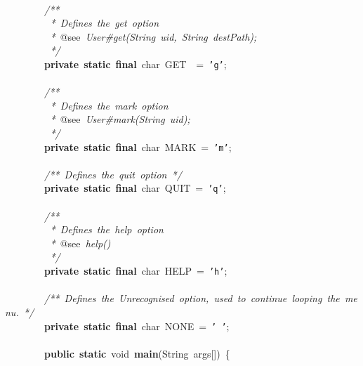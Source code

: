 \mbox{}\ \ \ \ \ \ \ \  \\
\mbox{}\ \ \ \ \ \ \ \ \textit{/**} \\
\mbox{}\textit{\ \ \ \ \ \ \ \ \ *\ Defines\ the\ get\ option} \\
\mbox{}\textit{\ \ \ \ \ \ \ \ \ *\ }@see\textit{\ User\#get(String\ uid,\ String\ destPath);} \\
\mbox{}\textit{\ \ \ \ \ \ \ \ \ */} \\
\mbox{}\ \ \ \ \ \ \ \ \textbf{private}\ \textbf{static}\ \textbf{final}\ char\ GET\ \ =\ \texttt{'g'}; \\
\mbox{}\ \ \ \ \ \ \ \  \\
\mbox{}\ \ \ \ \ \ \ \ \textit{/**} \\
\mbox{}\textit{\ \ \ \ \ \ \ \ \ *\ Defines\ the\ mark\ option} \\
\mbox{}\textit{\ \ \ \ \ \ \ \ \ *\ }@see\textit{\ User\#mark(String\ uid);} \\
\mbox{}\textit{\ \ \ \ \ \ \ \ \ */} \\
\mbox{}\ \ \ \ \ \ \ \ \textbf{private}\ \textbf{static}\ \textbf{final}\ char\ MARK\ =\ \texttt{'m'}; \\
\mbox{}\ \ \ \ \ \ \ \  \\
\mbox{}\ \ \ \ \ \ \ \ \textit{/**\ Defines\ the\ quit\ option\ */} \\
\mbox{}\ \ \ \ \ \ \ \ \textbf{private}\ \textbf{static}\ \textbf{final}\ char\ QUIT\ =\ \texttt{'q'}; \\
\mbox{}\ \ \ \ \ \ \ \  \\
\mbox{}\ \ \ \ \ \ \ \ \textit{/**\ } \\
\mbox{}\textit{\ \ \ \ \ \ \ \ \ *\ Defines\ the\ help\ option} \\
\mbox{}\textit{\ \ \ \ \ \ \ \ \ *\ }@see\textit{\ help()} \\
\mbox{}\textit{\ \ \ \ \ \ \ \ \ */} \\
\mbox{}\ \ \ \ \ \ \ \ \textbf{private}\ \textbf{static}\ \textbf{final}\ char\ HELP\ =\ \texttt{'h'}; \\
\mbox{}\ \ \ \ \ \ \ \  \\
\mbox{}\ \ \ \ \ \ \ \ \textit{/**\ Defines\ the\ Unrecognised\ option,\ used\ to\ continue\ looping\ the\ menu.\ */} \\
\mbox{}\ \ \ \ \ \ \ \ \textbf{private}\ \textbf{static}\ \textbf{final}\ char\ NONE\ =\ \texttt{'\ '}; \\
\mbox{} \\
\mbox{}\ \ \ \ \ \ \ \ \textbf{public}\ \textbf{static}\ void\ \textbf{main}(String\ args[])\ \{ \\
